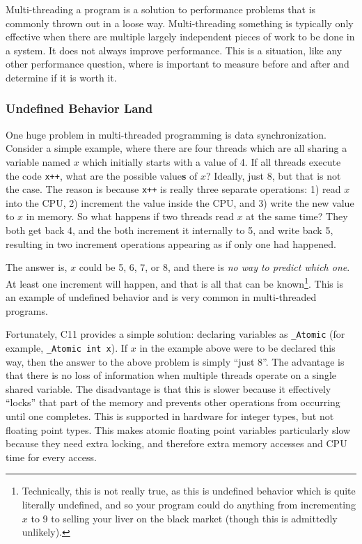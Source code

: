 Multi-threading a program is a solution to performance problems that is commonly thrown out in a loose way. Multi-threading something is
typically only effective when there are multiple largely independent pieces of work to be done in a system. It does not always improve
performance. This is a situation, like any other performance question, where is important to measure before and after and determine
if it is worth it.

\subsubsection{Undefined Behavior Land}

One huge problem in multi-threaded programming is data synchronization. Consider a simple example, where there are four threads which
are all sharing a variable named $x$ which initially starts with a value of 4. If all threads execute the code \texttt{x++}, what are
the possible value\textbf{s} of $x$? Ideally, just 8, but that is not the case. The reason is because \texttt{x++} is really three
separate operations: 1) read $x$ into the CPU, 2) increment the value inside the CPU, and 3) write the new value to $x$ in memory.
So what happens if two threads read $x$ at the same time? They both get back 4, and the both increment it internally to 5, and write
back 5, resulting in two increment operations appearing as if only one had happened.

The answer is, $x$ could be 5, 6, 7, or 8, and there is \textit{no way to predict which one}. At least one increment will happen, and
that is all that can be known\footnote{Technically, this is not really true, as this is undefined behavior which is quite literally undefined, and
so your program could do anything from incrementing $x$ to 9 to selling your liver on the black market (though this is admittedly unlikely).}. This is an example of undefined
behavior and is very common in multi-threaded programs.

Fortunately, C11 provides a simple solution: declaring variables as \texttt{\_Atomic} (for example, \texttt{\_Atomic int x}). If $x$ in
the example above were to be declared this way, then the answer to the above problem is simply ``just 8''. The advantage is that there
is no loss of information when multiple threads operate on a single shared variable. The disadvantage is that this is slower because
it effectively ``locks'' that part of the memory and prevents other operations from occurring until one completes. This is supported
in hardware for integer types, but not floating point types. This makes atomic floating point variables particularly slow because they
need extra locking, and therefore extra memory accesses and CPU time for every access.

